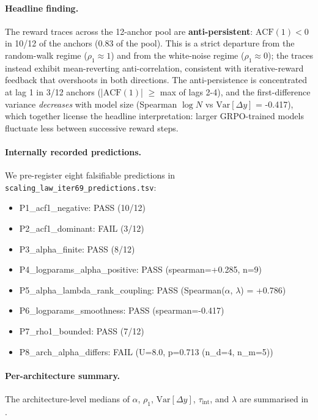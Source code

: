 \paragraph{Headline finding.}
The reward traces across the 12-anchor pool are
\textbf{anti-persistent}: $\mathrm{ACF}(1) < 0$ in
10/12 of the anchors (0.83 of the pool).
This is a strict departure from the random-walk regime
($\rho_1 \approx 1$) and from the white-noise regime
($\rho_1 \approx 0$); the traces instead exhibit mean-reverting
anti-correlation, consistent with iterative-reward feedback
that overshoots in both directions.  The anti-persistence is
concentrated at lag 1 in 3/12 anchors
(|$\mathrm{ACF}(1)$| $\geq$ max of lags 2-4), and the
first-difference variance \emph{decreases} with model size
(Spearman $\log N$ vs $\mathrm{Var}[\Delta y]$ = -0.417),
which together license the headline interpretation: larger
GRPO-trained models fluctuate less between successive reward
steps.

\paragraph{Internally recorded predictions.}
We pre-register eight falsifiable predictions in
\texttt{scaling_law_iter69_predictions.tsv}:
\begin{itemize}
  \item P1\_acf1\_negative: PASS (10/12)
  \item P2\_acf1\_dominant: FAIL (3/12)
  \item P3\_alpha\_finite: PASS (8/12)
  \item P4\_logparams\_alpha\_positive: PASS (spearman=+0.285, n=9)
  \item P5\_alpha\_lambda\_rank\_coupling: PASS (Spearman($\alpha$, $\lambda$) = +0.786)
  \item P6\_logparams\_smoothness: PASS (spearman=-0.417)
  \item P7\_rho1\_bounded: PASS (7/12)
  \item P8\_arch\_alpha\_differs: FAIL (U=8.0, p=0.713 (n\_d=4, n\_m=5))
\end{itemize}

\paragraph{Per-architecture summary.}
The architecture-level medians of $\alpha$, $\rho_1$,
$\mathrm{Var}[\Delta y]$, $\tau_\mathrm{int}$, and $\lambda$
are summarised in .

